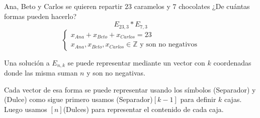\documentclass[../main.tex]{subfiles}
\begin{document}
Ana, Beto y Carlos se quieren repartir $23$ caramelos y $7$ chocolates
¿De cuántas formas pueden hacerlo?
\[
	E_{23,3}*E_{7,3}
\]
\[
	\begin{cases}
		x_{Ana}+x_{Beto}+x_{Carlos} = 23\\
		x_{Ana},x_{Beto},x_{Carlos}\in \mathbb{Z} \text{ y son no negativos}
	\end{cases}
\]

Una solución a $E_{n,k}$ se puede representar mediante un vector con $k$ coordenadas
donde las misma suman $n$ y son no negativas.

Cada vector de esa forma se puede representar usando los símbolos (Separador) y (Dulce)
como sigue primero usamos (Separador)$[k-1]$ para definir $k$ cajas.
Luego usamos $[n]$(Dulces) para representar el contenido de cada caja.
\end{document}
